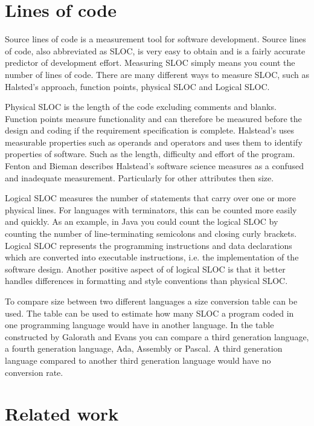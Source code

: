 \section{Lines of code}\label{sec:lines-of-code}
Source lines of code is a measurement tool for software development. Source lines of code, also abbreviated as SLOC, is very easy to obtain and is a fairly accurate predictor of development effort\cite[p.~63]{galorath2006}. Measuring SLOC simply means you count the number of lines of code. There are many different ways to measure SLOC, such as Halsted’s approach, function points, physical SLOC and Logical SLOC. 

Physical SLOC is the length of the code excluding comments and blanks. Function points measure functionality and can therefore be measured before the design and coding if the requirement specification is complete\cite[p.~187]{galorath2006}. Halstead’s uses measurable properties such as operands and operators and uses them to identify properties of software. Such as the length, difficulty and effort of the program. Fenton and Bieman describes Halstead’s software science measures as a confused and inadequate measurement. Particularly for other attributes then size\cite[p.~345]{fenton2015}.

Logical SLOC measures the number of statements that carry over one or more physical lines.  For languages with terminators, this can be counted more easily and quickly. As an example, in Java you could count the logical SLOC by counting the number of line-terminating semicolons and closing curly brackets. Logical SLOC represents the programming instructions and data declarations which are converted into executable instructions, i.e. the implementation of the software design. Another positive aspect of of logical SLOC is that it better handles differences in formatting and style conventions than physical SLOC\cite[p.~155]{galorath2006}.

To compare size between two different languages a size conversion table can be used. The table can be used to estimate how many SLOC a program coded in one programming language would have in another language. In the table constructed by Galorath and Evans you can compare a third generation language, a fourth generation language, Ada, Assembly or Pascal\cite[p.~163]{galorath2006}. A third generation language compared to another third generation language would have no conversion rate. 

\section{Related work}\label{sec:related-work}
